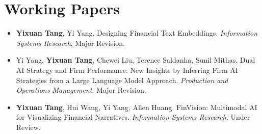 \documentclass[11pt,a4paper]{article}
\begin{document}
\section*{Working Papers}
\begin{itemize}[itemsep=3pt]
  \item \textbf{Yixuan Tang}, Yi Yang. Designing Financial Text Embeddings. \textit{Information Systems Research}, Major Revision.
  \item Yi Yang, \textbf{Yixuan Tang}, Chewei Liu, Terence Saldanha, Sunil Mithas. Dual AI Strategy and Firm Performance: New Insights by Inferring Firm AI Strategies from a Large Language Model Approach. \textit{Production and Operations Management}, Major Revision.
  \item \textbf{Yixuan Tang}, Hui Wang, Yi Yang, Allen Huang. FinVision: Multimodal AI for Visualizing Financial Narratives. \textit{Information Systems Research}, Under Review.
\end{itemize}

\end{document}
